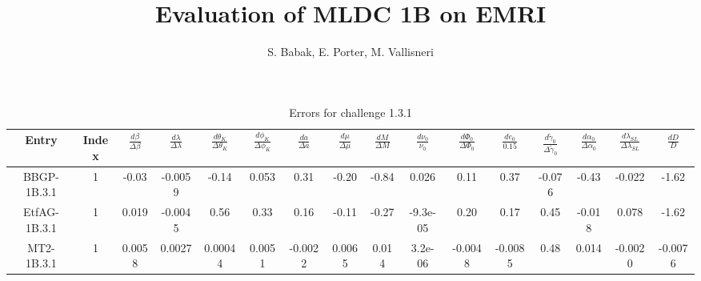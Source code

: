 \documentclass[prd,aps,amsfonts,amsmath, nofootinbib]{revtex4}
\begin{document}
\title{Evaluation of MLDC 1B on EMRI}
\author{S. Babak, E. Porter, M. Vallisneri}
\maketitle


\begin{table}
\caption{\label{EMRI_err} Errors for challenge 1.3.1}
\begin{ruledtabular}
\begin{tabular}{|c|c|c|c|c|c|c|c|c|c|c|c|c|c|c|c|}
Entry & Index & $\frac{d\beta}{\Delta\beta}$ & 
$\frac{d\lambda}{\Delta\lambda}$ &
 $\frac{d\theta_K}{\Delta\theta_K}$ & $\frac{d\phi_K}{\Delta\phi_K}$ 
 & $\frac{da}{\Delta a}$ & $\frac{d\mu}{\Delta\mu}$ & 
 $\frac{dM}{\Delta M}$ &  $\frac{d\nu_0}{\nu_0}$ & 
 $\frac{d\Phi_0}{\Delta\Phi_0}$ &  $\frac{de_0}{0.15}$ & 
 $\frac{d\tilde{\gamma}_0}{\Delta\tilde{\gamma}_0}$ &
 $\frac{d\alpha_0}{\Delta\alpha_0}$ & 
 $\frac{d\lambda_{SL}}{\Delta\lambda_{SL}}$ &
  $\frac{dD}{D}$ \\ 
\hline
BBGP-1B.3.1 & 1 & -0.03   &   -0.0059   &   -0.14   &   0.053   &   0.31   &   -0.20   &   -0.84   &   0.026   &   0.11   &   0.37   &   -0.076   &   -0.43   &   -0.022   &   -1.62  \\
EtfAG-1B.3.1 & 1 & 0.019   &   -0.0045   &   0.56   &   0.33   &   0.16   &   -0.11   &   -0.27   &   -9.3e-05   &   0.20   &   0.17   &   0.45   &   -0.018   &   0.078   &   -1.62 \\
MT2-1B.3.1 & 1 &  0.0058   &   0.0027   &   0.00044   &   0.0051   &   -0.0022   &   0.0065   &   0.014   &   3.2e-06   &   -0.0048   &   -0.0085   &   0.48   &   0.014   &   -0.0020   &   -0.0076 \\
\hline
\end{tabular}
\end{ruledtabular}
\end{table}
\end{document}
